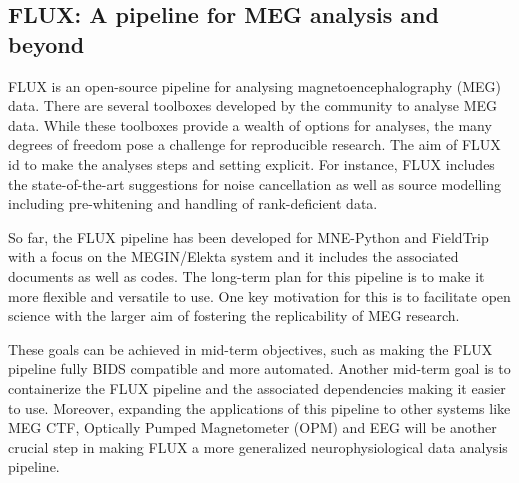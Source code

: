 \documentclass[../main.tex]{subfiles}
\begin{document}
\subsection{FLUX: A pipeline for MEG analysis and beyond}

%

FLUX \parencite{Ferrante2022} is an open-source pipeline for analysing magnetoencephalography (MEG) data. There are several toolboxes developed by the community to analyse MEG data. While these toolboxes provide a wealth of options for analyses, the many degrees of freedom pose a challenge for reproducible research. The aim of FLUX id to make the analyses steps and setting explicit. For instance, FLUX includes the state-of-the-art suggestions for noise cancellation as well as source modelling including pre-whitening and handling of rank-deficient data.

So far, the FLUX pipeline has been developed for MNE-Python \parencite{Gramfort2014} and FieldTrip \parencite{Oostenveld2011} with a focus on the MEGIN/Elekta system and it includes the associated documents as well as codes.
The long-term plan for this pipeline is to make it more flexible and versatile to use. One key motivation for this is to facilitate open science with the larger aim of fostering the replicability of MEG research.

These goals can be achieved in mid-term objectives, such as making the FLUX pipeline fully BIDS compatible and more automated. Another mid-term goal is to containerize the FLUX pipeline and the associated dependencies making it easier to use. Moreover, expanding the applications of this pipeline to other systems like MEG CTF, Optically Pumped Magnetometer (OPM) and EEG will be another crucial step in making FLUX a more generalized neurophysiological data analysis pipeline.
\end{document}
